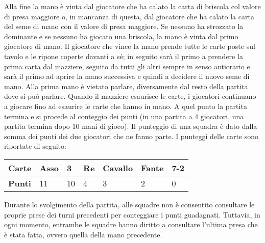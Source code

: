 \documentclass[a4paper,12pt]{article}
\begin{document}
Alla fine la mano è vinta dal giocatore che ha calato la carta di briscola col valore di presa maggiore o, in mancanza di questa, dal giocatore che ha calato la carta del seme di mano con il valore di presa maggiore. Se nessuno ha strozzato la dominante e se nessuno ha giocato una briscola, la mano è vinta dal primo giocatore di mano. Il giocatore che vince la mano prende tutte le carte poste sul tavolo e le ripone coperte davanti a sé; in seguito sarà il primo a prendere la prima carta dal mazziere, seguito da tutti gli altri sempre in senso antiorario e sarà il primo ad aprire la mano successiva e quindi a decidere il nuovo seme di mano. Alla prima mano è vietato parlare, diversamente dal resto della partita dove si può parlare. Quando il mazziere esaurisce le carte, i giocatori continuano a giocare fino ad esaurire le carte che hanno in mano. A quel punto la partita termina e si procede al conteggio dei punti (in una partita a 4 giocatori, una partita termina dopo 10 mani di gioco). Il punteggio di una squadra è dato dalla somma dei punti dei due giocatori che ne fanno parte. I punteggi delle carte sono riportate di seguito:

\begin{center}
	\begin{tabular}{| l | l | l | l | l | l | l |}
		\hline
		\textbf{Carte} & Asso & 3 & Re & Cavallo & Fante & 7-2 \\ \hline
		\textbf{Punti} & 11 & 10 & 4 & 3 & 2 & 0 \\ 
		\hline
	\end{tabular}
\end{center}

Durante lo svolgimento della partita, alle squadre non è consentito consultare le proprie prese dei turni precedenti per conteggiare i punti guadagnati. Tuttavia, in ogni momento, entrambe le squadre hanno diritto a consultare l'ultima presa che è stata fatta, ovvero quella della mano precedente.
\end{document}

